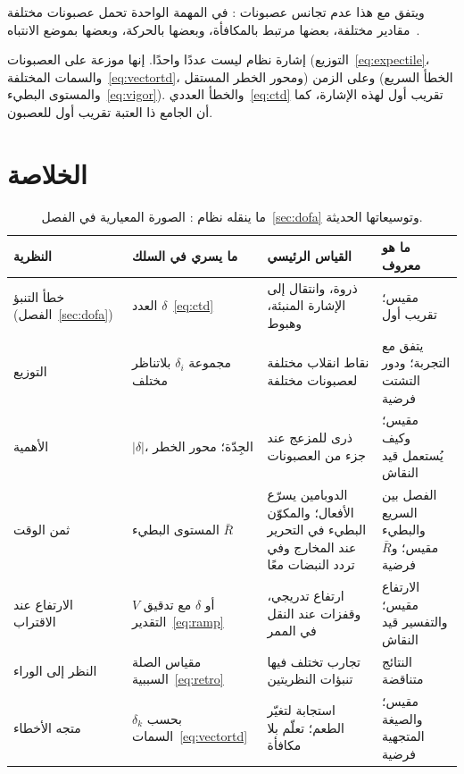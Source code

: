 ويتفق مع هذا عدم تجانس عصبونات : في المهمة الواحدة تحمل عصبونات مختلفة مقادير مختلفة، بعضها مرتبط بالمكافأة، وبعضها بالحركة، وبعضها بموضع الانتباه~\cite{Engelhard2019}.

\begin{keyblock}
\begin{proposition}
\label{prop:bundle}
إشارة نظام  ليست عددًا واحدًا. إنها موزعة على العصبونات (التوزيع~\eqref{eq:expectile}، والسمات المختلفة~\eqref{eq:vectortd}، ومحور الخطر المستقل) وعلى الزمن (الخطأ السريع والمستوى البطيء~\eqref{eq:vigor}). والخطأ العددي~\eqref{eq:ctd} تقريب أول لهذه الإشارة، كما أن الجامع ذا العتبة تقريب أول للعصبون.
\end{proposition}
\end{keyblock}

\section{الخلاصة}

\begin{table}[t]
\centering
\footnotesize
\setlength{\tabcolsep}{4pt}
\renewcommand{\arraystretch}{1.15}
\begin{tabular}{>{\raggedright}p{2.5cm}>{\raggedright}p{3.2cm}>{\raggedright}p{3.6cm}>{\raggedright\arraybackslash}p{4.2cm}}
\toprule
النظرية & ما يسري في السلك & القياس الرئيسي & ما هو معروف \\
\midrule
خطأ التنبؤ (الفصل~\ref{sec:dofa}) & العدد $\delta$~\eqref{eq:ctd} & ذروة، وانتقال إلى الإشارة المنبئة، وهبوط & مقيس؛ تقريب أول \\
التوزيع & مجموعة $\delta_i$ بلاتناظر مختلف & نقاط انقلاب مختلفة لعصبونات مختلفة & يتفق مع التجربة؛ ودور التشتت فرضية \\
الأهمية & $|\delta|$، الجِدّة؛ محور الخطر & ذرى للمزعج عند جزء من العصبونات & مقيس؛ وكيف يُستعمل قيد النقاش \\
ثمن الوقت & المستوى البطيء $\bar R$ & الدوبامين يسرّع الأفعال؛ والمكوّن البطيء في التحرير عند المخارج وفي تردد النبضات معًا & الفصل بين السريع والبطيء مقيس؛ و$\bar R$ فرضية \\
الارتفاع عند الاقتراب & $V$ أو $\delta$ مع تدقيق التقدير~\eqref{eq:ramp} & ارتفاع تدريجي، وقفزات عند النقل في الممر & الارتفاع مقيس؛ والتفسير قيد النقاش \\
النظر إلى الوراء & مقياس الصلة السببية~\eqref{eq:retro} & تجارب تختلف فيها تنبؤات النظريتين & النتائج متناقضة \\
متجه الأخطاء & $\delta_k$ بحسب السمات~\eqref{eq:vectortd} & استجابة لتغيّر الطعم؛ تعلّم بلا مكافأة & مقيس؛ والصيغة المتجهية فرضية \\
\bottomrule
\end{tabular}
\caption{ما ينقله نظام : الصورة المعيارية في الفصل~\ref{sec:dofa} وتوسيعاتها الحديثة.}
\label{tab:dofaalt}
\end{table}

